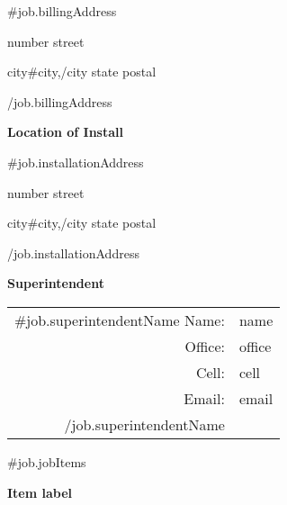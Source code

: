 \documentclass[11pt]{article}
\begin{document}
{\begin{multicols}{3}
  \vspace{1em}
  {{#job.billingAddress}}
  \centerline{ {{number}} {{street}} }
  \centerline{ {{city}}{{#city}},{{/city}} {{state}} {{postal}} }
  {{/job.billingAddress}}
  \vfill
  \columnbreak

  \centerline{\textbf{Location of Install}}
  \vspace{1em}
  {{#job.installationAddress}}
  \centerline{ {{number}} {{street}} }
  \centerline{ {{city}}{{#city}},{{/city}} {{state}} {{postal}} }
  {{/job.installationAddress}}
  \vspace{1em}

  \centerline{\textbf{Superintendent}}
  \begin{tabularx}{0.95\linewidth}{rX}
  {{#job.superintendentName}}
    Name: & {{name}} \\
    Office: & {{office}} \\
    Cell: & {{cell}} \\
    Email: & {{email}} \\
  {{/job.superintendentName}}
  \end{tabularx}
  \vfill
\end{multicols}
}


{{#job.jobItems}}
\ctaheader
\centerline{\textbf{Item {{label}} }}
\end{document}
